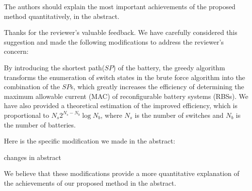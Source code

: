 \reviewer
\begin{revcomment}
  The authors should explain the most important achievements of the proposed method quantitatively, in the abstract.
\end{revcomment}
\begin{revresponse}

Thanks for the reviewer's valuable feedback. We have carefully considered this suggestion and made the following modifications to address the reviewer's concern:


By introducing the shortest path($SP$) of the battery, the greedy algorithm transforms the enumeration of switch states in the brute force algorithm into the combination of the $SP$s, which greatly increases the efficiency of determining the maximum allowable current (MAC) of reconfigurable battery systems (RBSs). We have also provided a theoretical estimation of the improved efficiency, which is proportional to $N_s 2^{N_s - N_b} \log N_b$, where $N_s$ is the number of switches and $N_b$ is the number of batteries.


Here is the specific modification we made in the abstract:
\begin{changes}
  changes in abstract
\end{changes}


We believe that these modifications provide a more quantitative explanation of the achievements of our proposed method in the abstract. 

\end{revresponse}

